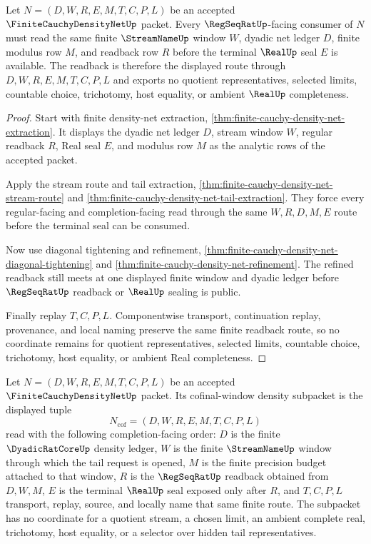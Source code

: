 \begin{theorem}
\label{thm:finite-cauchy-density-net-regular-readback}
Let $N=(D,W,R,E,M,T,C,P,L)$ be an accepted $\FiniteCauchyDensityNetUp$ packet. Every $\RegSeqRatUp$-facing consumer of $N$ must read the same finite $\StreamNameUp$ window $W$, dyadic net ledger $D$, finite modulus row $M$, and readback row $R$ before the terminal $\RealUp$ seal $E$ is available. The readback is therefore the displayed route through $D,W,R,E,M,T,C,P,L$ and exports no quotient representatives, selected limits, countable choice, trichotomy, host equality, or ambient $\RealUp$ completeness.
\end{theorem}
\begin{proof}
Start with finite density-net extraction, \autoref{thm:finite-cauchy-density-net-extraction}. It displays the dyadic net ledger $D$, stream window $W$, regular readback $R$, Real seal $E$, and modulus row $M$ as the analytic rows of the accepted packet.

Apply the stream route and tail extraction, \autoref{thm:finite-cauchy-density-net-stream-route} and \autoref{thm:finite-cauchy-density-net-tail-extraction}. They force every regular-facing and completion-facing read through the same $W,R,D,M,E$ route before the terminal seal can be consumed.

Now use diagonal tightening and refinement, \autoref{thm:finite-cauchy-density-net-diagonal-tightening} and \autoref{thm:finite-cauchy-density-net-refinement}. The refined readback still meets at one displayed finite window and dyadic ledger before $\RegSeqRatUp$ readback or $\RealUp$ sealing is public.

Finally replay $T,C,P,L$. Componentwise transport, continuation replay, provenance, and local naming preserve the same finite readback route, so no coordinate remains for quotient representatives, selected limits, countable choice, trichotomy, host equality, or ambient Real completeness.
\end{proof}

\begin{definition}
\label{def:finite-cauchy-density-net-density-carrier}
Let $N=(D,W,R,E,M,T,C,P,L)$ be an accepted $\FiniteCauchyDensityNetUp$ packet. Its cofinal-window density subpacket is the displayed tuple
$$
N_{\mathrm{cof}}=(D,W,R,E,M,T,C,P,L)
$$
read with the following completion-facing order: $D$ is the finite $\DyadicRatCoreUp$ density ledger, $W$ is the finite $\StreamNameUp$ window through which the tail request is opened, $M$ is the finite precision budget attached to that window, $R$ is the $\RegSeqRatUp$ readback obtained from $D,W,M$, $E$ is the terminal $\RealUp$ seal exposed only after $R$, and $T,C,P,L$ transport, replay, source, and locally name that same finite route. The subpacket has no coordinate for a quotient stream, a chosen limit, an ambient complete real, trichotomy, host equality, or a selector over hidden tail representatives.
\end{definition}

